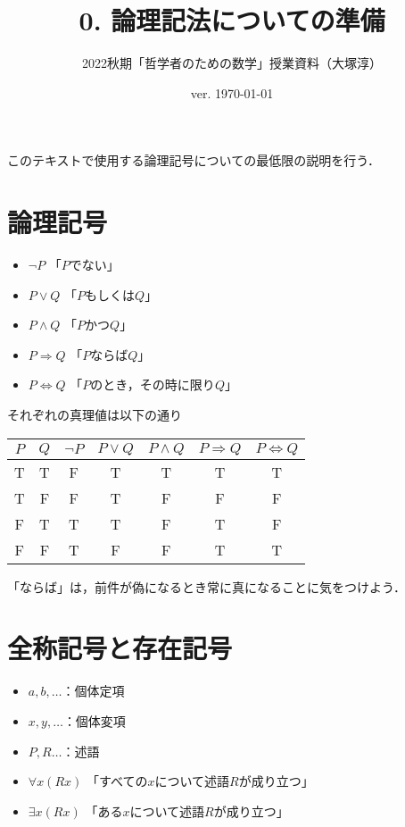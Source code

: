 \documentclass[11pt,a4paper]{jsarticle}
\begin{document}
\title{0. 論理記法についての準備}
\author{2022秋期「哲学者のための数学」授業資料（大塚淳）}
\date{ver. \today}
\maketitle

このテキストで使用する論理記号についての最低限の説明を行う．

\section{論理記号}
\begin{itemize}
 \item $\neg P$ 「$P$でない」
 \item $P \vee Q$ 「$P$もしくは$Q$」
 \item $P \wedge Q$ 「$P$かつ$Q$」
 \item $P \Rightarrow Q$ 「$P$ならば$Q$」
 \item $P \iff Q$ 「$P$のとき，その時に限り$Q$」
\end{itemize}

それぞれの真理値は以下の通り

\begin{table}[h]
\centering
\begin{tabular}{cc|ccccc} \hline
 $P$ & $Q$ & $\neg P$ & $P \vee Q$ & $P \wedge Q$ & $P \Rightarrow Q$ & $P \iff Q$ \\ \hline 
 T  & T & F & T & T & T & T \\
 T  & F & F & T & F & F & F \\
 F  & T & T & T & F & T & F \\
 F  & F & T & F & F & T & T \\ \hline
\end{tabular} 
\end{table}

\begin{attn}
「ならば」は，前件が偽になるとき常に真になることに気をつけよう．
\end{attn}


\section{全称記号と存在記号}
\begin{itemize}
 \item $a, b, \dots$：個体定項
 \item $x, y, \dots$：個体変項
 \item $P, R \dots$：述語
 \item $\forall x (Rx)$ 「すべての$x$について述語$R$が成り立つ」
 \item $\exists x (Rx)$ 「ある$x$について述語$R$が成り立つ」
\end{itemize}
\end{document}
